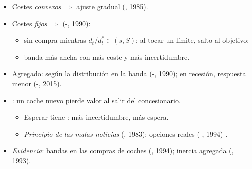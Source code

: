 \documentclass{article}
\begin{document}
\begin{columnas}
\begin{itemize}
\item Costes \emph{convexos} $\Rightarrow$ ajuste gradual (, 1985).
\item Costes \emph{fijos} $\Rightarrow$  (-, 1990):
  \begin{itemize}
  \item sin compra mientras $d_t/d^*_t\in(s,S)$; al tocar un límite, salto al objetivo;
  \item banda más ancha con más coste y más incertidumbre.
  \end{itemize}
\item Agregado: según la distribución en la banda (-, 1990); en recesión, respuesta menor (-, 2015).
\item {}: un coche nuevo pierde valor al salir del concesionario.
  \begin{itemize}
  \item Esperar tiene : más incertidumbre, más espera.
  \item \emph{Principio de las malas noticias} (, 1983); opciones reales (-, 1994) .
  \end{itemize}
\item \emph{Evidencia}: bandas en las compras de coches (, 1994); inercia agregada (, 1993).
\end{itemize}


\end{columnas}
\end{document}
